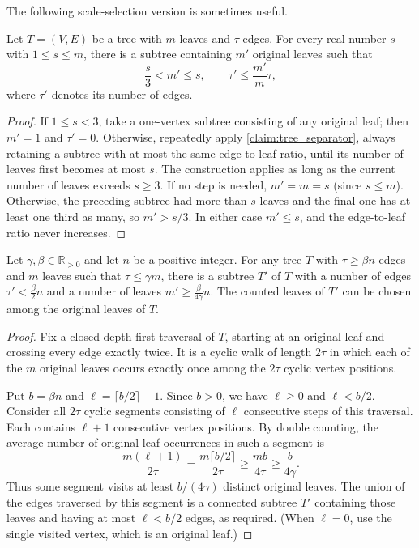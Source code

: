 The following scale-selection version is sometimes useful.
\begin{corollary}
  Let $T=(V,E)$ be a tree with $m$ leaves and $\tau$ edges. For every
  real number $s$ with $1\le s\le m$, there is a subtree containing
  $m'$ original leaves such that
  \[
    \frac{s}{3}<m'\le s,
    \qquad \tau'\le\frac{m'}{m}\tau,
  \]
  where $\tau'$ denotes its number of edges.
\end{corollary}

\begin{proof}
  If $1\le s<3$, take a one-vertex subtree consisting of any
  original leaf; then $m'=1$ and $\tau'=0$.
  Otherwise, repeatedly apply \cref{claim:tree_separator}, always
  retaining a subtree with at most the same edge-to-leaf ratio, until
  its number of leaves first becomes at most $s$. The construction
  applies as long as the current number of leaves exceeds $s\ge3$.
  If no step is needed, $m'=m=s$ (since $s\le m$). Otherwise, the
  preceding subtree had more than $s$ leaves and the final one has at
  least one third as many, so $m'>s/3$. In either case $m'\le s$,
  and the edge-to-leaf ratio never increases.
\end{proof}

\begin{claim}
  \label{claim:big_subtree}
  Let $\gamma,\beta\in\mathbb{R}_{>0}$ and let $n$ be a positive
  integer. For any tree $T$ with $\tau\ge\beta n$ edges and $m$ leaves
  such that $\tau\le\gamma m$, there is a subtree $T'$ of $T$ with a
  number of edges $\tau'<\frac{\beta}{2}n$ and a number of leaves
  $m'\ge\frac{\beta}{4\gamma}n$. The counted leaves of $T'$ can be
  chosen among the original leaves of $T$.
\end{claim}

\begin{proof}
  Fix a closed depth-first traversal of $T$, starting at an original
  leaf and crossing every edge exactly twice. It is a cyclic walk of
  length $2\tau$ in which each of the $m$ original leaves occurs
  exactly once among the $2\tau$ cyclic vertex positions.

  Put $b=\beta n$ and $\ell=\lceil b/2\rceil-1$. Since $b>0$, we have
  $\ell\ge0$ and $\ell<b/2$. Consider all $2\tau$ cyclic segments
  consisting of $\ell$ consecutive steps of this traversal. Each
  contains $\ell+1$ consecutive vertex positions. By double counting,
  the average number of original-leaf occurrences in such a segment is
  \[
    \frac{m(\ell+1)}{2\tau}
    =\frac{m\lceil b/2\rceil}{2\tau}
    \ge\frac{mb}{4\tau}
    \ge\frac{b}{4\gamma}.
  \]
  Thus some segment visits at least $b/(4\gamma)$ distinct original
  leaves. The union of the edges traversed by this segment is a
  connected subtree $T'$ containing those leaves and having at most
  $\ell<b/2$ edges, as required. (When $\ell=0$, use the single
  visited vertex, which is an original leaf.)
\end{proof}
